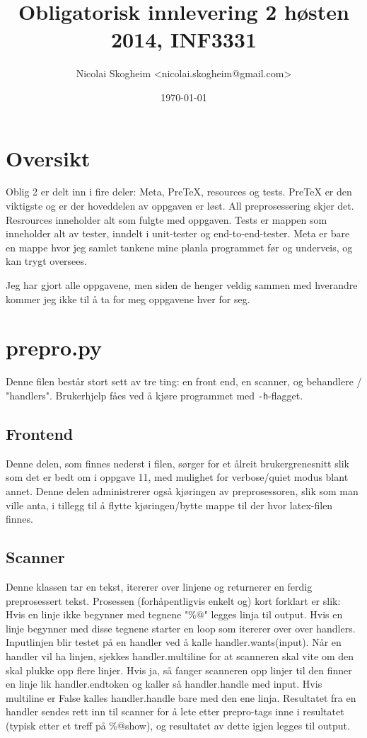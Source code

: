 \documentclass{article}
\title{Obligatorisk innlevering 2 høsten 2014, INF3331}
\author{Nicolai Skogheim <nicolai.skogheim@gmail.com>}
\date{\today}
\newcommand{\code}[1]{\colorbox{codegray}{\texttt{#1}}}
\begin{document}
\maketitle

\section{Oversikt}
Oblig 2 er delt inn i fire deler: Meta, PreTeX, resources og tests.
PreTeX er den viktigste og er der hoveddelen av oppgaven er løst.
All preprosessering skjer det.
Resrources inneholder alt som fulgte med oppgaven.
Tests er mappen som inneholder alt av tester, inndelt i unit-tester
og end-to-end-tester.
Meta er bare en mappe hvor jeg samlet tankene mine planla programmet
før og underveis, og kan trygt oversees.

Jeg har gjort alle oppgavene, men siden de henger veldig sammen med
hverandre kommer jeg ikke til å ta for meg oppgavene hver for seg.


\section{prepro.py}
Denne filen består stort sett av tre ting: en front end, en scanner, og
behandlere / "handlers". Brukerhjelp fåes ved å kjøre programmet
med \code{-h}-flagget.

\subsection{Frontend}
Denne delen, som finnes nederst i filen, sørger for et ålreit brukergrenesnitt
slik som det er bedt om i oppgave 11, med mulighet for verbose/quiet modus
blant annet. Denne delen administrerer også kjøringen av preprosessoren, slik
som man ville anta, i tillegg til å flytte kjøringen/bytte mappe til der hvor
latex-filen finnes.

\subsection{Scanner}
Denne klassen tar en tekst, itererer over linjene og returnerer en ferdig
preprosessert tekst. Prosessen (forhåpentligvis enkelt og) kort forklart er slik:
Hvis en linje ikke begynner med tegnene "\%@" legges linja til output.
Hvis en linje begynner med disse tegnene starter en loop som itererer over
over handlers. Inputlinjen blir testet på en handler ved å kalle
handler.wants(input). Når en handler vil ha linjen, sjekkes handler.multiline
for at scanneren skal vite om den skal plukke opp flere linjer. Hvis ja, så
fanger scanneren opp linjer til den finner en linje lik handler.endtoken og
kaller så handler.handle med input. Hvis multiline er False kalles handler.handle
bare med den ene linja. Resultatet fra en handler sendes rett inn til scanner
for å lete etter prepro-tags inne i resultatet (typisk etter et treff på \%@show),
og resultatet av dette igjen legges til output.
\end{document}
